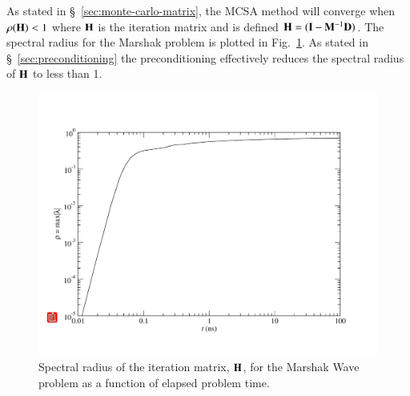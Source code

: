 \documentclass[preprint,12pt]{elsarticle}
\newcommand{\vI}{\ensuremath{\ve{I}}}
\begin{document}
As stated in \S~\ref{sec:monte-carlo-matrix}, the MCSA method will converge
when $\rho(\mathbf{H})< 1$ where $\mathbf{H}$ is the iteration matrix and is defined
$\ve{H} = (\vI - \ve{M}^{-1}\ve{D})$.  The spectral radius for the Marshak
problem is plotted in Fig.~\ref{fig:marshak_spectral}.  As stated in
\S~\ref{sec:preconditioning} the preconditioning effectively reduces the
spectral radius of $\mathbf{H}$ to less than 1.
\begin{figure}[h!]
  \centerline{ \includegraphics[width=5in,clip]{spectral_radius.pdf}}
  \caption{Spectral radius of the iteration matrix, $\mathbf{H}$, for the
    Marshak Wave problem as a function of elapsed problem time.}
  \label{fig:marshak_spectral}
\end{figure}
\end{document}
